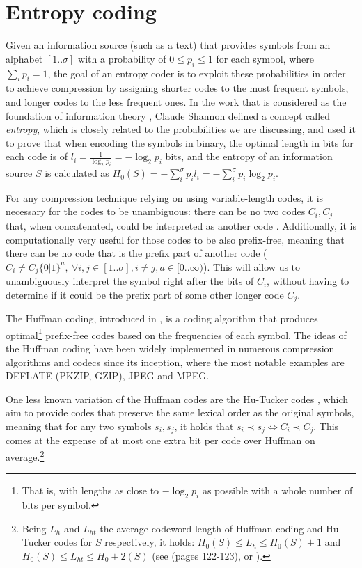 \documentclass[a4paper,10pt,twoside]{book}
\begin{document}
	\section{Entropy coding}
	Given an information source (such as a text) that provides symbols from an alphabet $[1..\sigma]$ with a probability of $0 \leq p_i \leq 1$ for each symbol, where $\displaystyle\sum_ip_i=1$, the goal of an entropy coder is to exploit these probabilities in order to achieve compression by assigning shorter codes to the most frequent symbols, and longer codes to the less frequent ones. In the work that is considered as the foundation of information theory \cite{shannon1948mathematical}, Claude Shannon defined a concept called \textit{entropy}, which is closely related to the probabilities we are discussing, and used it to prove that when encoding the symbols in binary, the optimal length in bits for each code is of $l_i = \frac{1}{\log_2p_i} = -\log_2p_i$ bits, and the entropy of an information source $S$ is calculated as $H_0(S) = -\displaystyle\sum^\sigma_i p_il_i = -\displaystyle\sum^\sigma_i p_i\log_2p_i$.
	
	For any compression technique relying on using variable-length codes, it is necessary for the codes to be unambiguous: there can be no two codes $C_i, C_j$ that, when concatenated, could be interpreted as another code 
	. Additionally, it is computationally very useful for those codes to be also prefix-free, meaning that there can be no code that is the prefix part of another code ($C_i \neq C_j\{0|1\}^a,~\forall i,j \in [1..\sigma], i\neq j, a \in [0..\infty)$). This will allow us to unambiguously interpret the symbol right after the bits of $C_i$, without having to determine if it could be the prefix part of some other longer code $C_j$.
	
	The Huffman coding, introduced in \cite{huffman1952method}, is a coding algorithm that produces optimal\footnote{That is, with lengths as close to $-\log_2p_i$ as possible with a whole number of bits per symbol.} prefix-free codes based on the frequencies of each symbol. The ideas of the Huffman coding have been widely implemented in numerous compression algorithms and codecs since its inception, where the most notable examples are DEFLATE (PKZIP, GZIP), JPEG and MPEG.
	
	One less known variation of the Huffman codes are the Hu-Tucker codes \cite{hu1971optimal}, which aim to provide codes that preserve the same lexical order as the original symbols, meaning that for any two symbols $s_i,s_j$, it holds that $s_i \prec s_j \iff C_i \prec C_j$. This comes at the expense of at most one extra bit per code over Huffman on average.\footnote{Being $L_h$ and $L_{ht}$ the average codeword 
	length of Huffman coding and Hu-Tucker codes for $S$ respectively, it holds: $H_0(S) \leq L_h \leq H_0(S)+1$ and $H_0(S) \leq L_{ht} \leq H_0+2(S)$
	(see \cite{Cover:2006:EIT:1146355} (pages 122-123), or \cite{HORIBE1977148, GilbertandMore1959}).}
	
\end{document}
